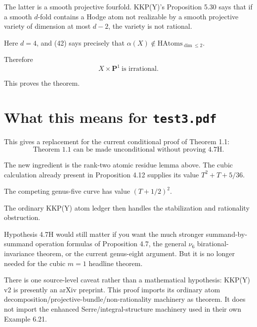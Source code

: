 \documentclass[11pt]{article}
\theoremstyle{definition}
\theoremstyle{remark}
\newcommand{\PP}{\mathbf P}
\begin{document}
The latter is a smooth projective fourfold. KKP(Y)'s Proposition 5.30 says that
if a smooth $d$-fold contains a Hodge atom not realizable by a smooth projective
variety of dimension at most $d-2$, the variety is not rational.

Here $d=4$, and (42) says precisely that
$\alpha(X)\notin\mathrm{HAtoms}_{\dim\le2}$.

Therefore
\[
  \boxed{\ X\times\PP^1\ \text{is irrational.}\ }
\]

This proves the theorem.

\section*{What this means for \texttt{test3.pdf}}

This gives a replacement for the current conditional proof of Theorem 1.1:
\[
  \boxed{\ \text{Theorem 1.1 can be made unconditional without proving 4.7H.}\ }
\]

The new ingredient is the rank-two atomic residue lemma above. The cubic
calculation already present in Proposition 4.12 supplies its value
$T^2+T+5/36$.

The competing genus-five curve has value $(T+1/2)^2$.

The ordinary KKP(Y) atom ledger then handles the stabilization and rationality
obstruction.

Hypothesis 4.7H would still matter if you want the much stronger
summand-by-summand operation formulas of Proposition 4.7, the general $\nu_6$
birational-invariance theorem, or the current genus-eight argument. But it is no
longer needed for the cubic $m=1$ headline theorem.

There is one source-level caveat rather than a mathematical hypothesis: KKP(Y)
v2 is presently an arXiv preprint. This proof imports its ordinary atom
decomposition/projective-bundle/non-rationality machinery as theorem. It does
not import the enhanced Serre/integral-structure machinery used in their own
Example 6.21.
\end{document}
